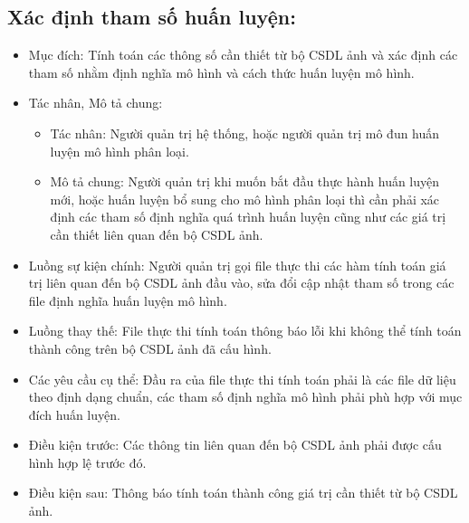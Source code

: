 \subsection{Xác định tham số huấn luyện:}
\begin{itemize}
	\item Mục đích: Tính toán các thông số cần thiết từ bộ CSDL ảnh và xác định các	tham số nhằm định nghĩa mô hình và cách thức huấn luyện mô hình.
	\item Tác nhân, Mô tả chung:
	\begin{itemize}
		\item Tác nhân: Người quản trị hệ thống, hoặc người quản trị mô đun huấn luyện mô hình phân loại.
		\item Mô tả chung: Người quản trị khi muốn bắt đầu thực hành huấn luyện	mới, hoặc huấn luyện bổ sung cho mô hình phân loại thì cần phải xác định các tham số định nghĩa quá trình huấn luyện cũng như các giá trị cần thiết liên quan đến bộ CSDL ảnh.	
	\end{itemize}
	\item Luồng sự kiện chính: Người quản trị gọi file thực thi các hàm tính toán giá trị liên quan đến bộ CSDL ảnh đầu vào, sửa đổi cập nhật tham số trong các file định nghĩa huấn luyện mô hình.
	\item Luồng thay thế: File thực thi tính toán thông báo lỗi khi không thể tính toán	thành công trên bộ CSDL ảnh đã cấu hình.
	\item Các yêu cầu cụ thể: Đầu ra của file thực thi tính toán phải là các file dữ liệu theo định dạng chuẩn, các tham số định nghĩa mô hình phải phù hợp với mục	đích huấn luyện.
	\item Điều kiện trước: Các thông tin liên quan đến bộ CSDL ảnh phải được cấu hình hợp lệ trước đó.
	\item Điều kiện sau: Thông báo tính toán thành công giá trị cần thiết từ bộ CSDL ảnh.
\end{itemize}


